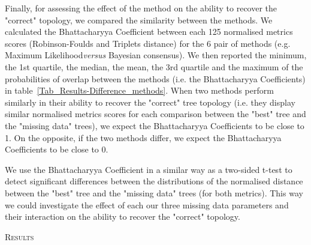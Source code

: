\documentclass[12pt,letterpaper]{article}
\renewcommand{\section}[1]{%
\bigskip
\begin{center}
\begin{Large}
\normalfont\scshape #1
\medskip
\end{Large}
\end{center}}
\renewcommand{\subsection}[1]{%
\bigskip
\begin{center}
\begin{large}
\normalfont\itshape #1
\end{large}
\end{center}}
\begin{document}
Finally, for assessing the effect of the method on the ability to recover the "correct" topology, we compared the similarity between the methods. We calculated the Bhattacharyya Coefficient between each 125 normalised metrics scores (Robinson-Foulds and Triplets distance) for the 6 pair of methods (e.g. Maximum Likelihood\textit{versus} Bayesian consensus). We then reported the minimum, the 1st quartile, the median, the mean, the 3rd quartile and the maximum of the probabilities of overlap between the methods (i.e. the Bhattacharyya Coefficients) in table~\ref{Tab_Results-Difference_methods}. When two methods perform similarly in their ability to recover the "correct" tree topology (i.e. they display similar normalised metrics scores for each comparison between the "best" tree and the "missing data" trees), we expect the Bhattacharyya Coefficients to be close to 1. On the opposite, if the two methods differ, we expect the Bhattacharyya Coefficients to be close to 0.

We use the Bhattacharyya Coefficient in a similar way as a two-sided t-test to detect significant differences between the distributions of the normalised distance between the "best" tree and the "missing data" trees (for both metrics).
This way we could investigate the effect of each our three missing data parameters and their interaction on the ability to recover the "correct" topology.

%
%

\section{Results}


\end{document}
